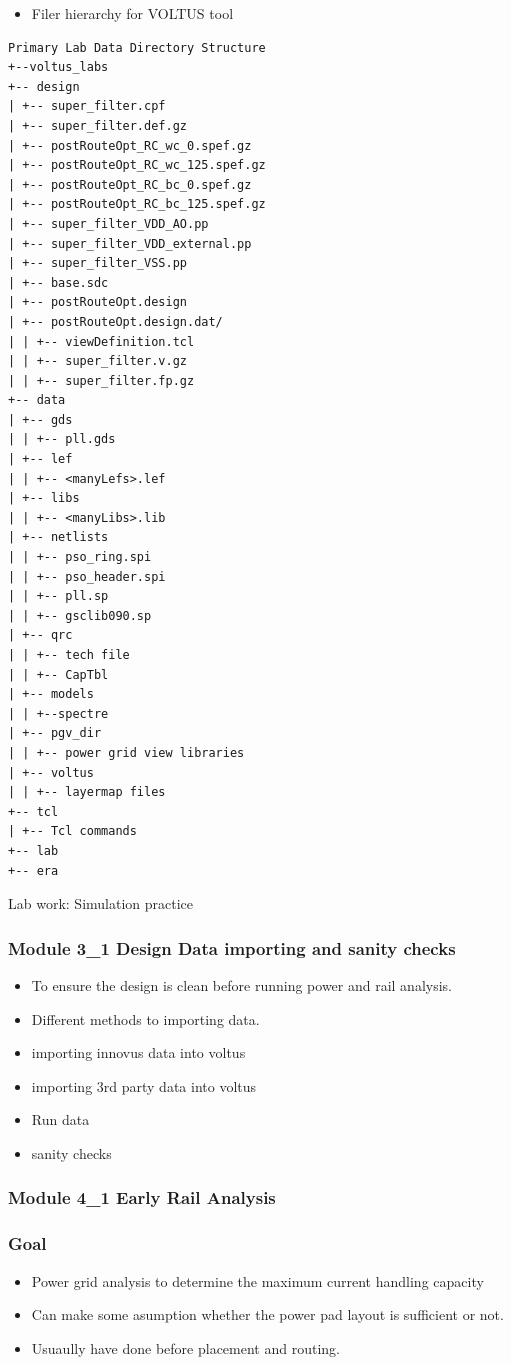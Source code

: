 \documentclass[a4paper]{article}
\begin{document}
\begin{itemize}
\item Filer hierarchy for VOLTUS tool
\end{itemize}
\begin{verbatim}
Primary Lab Data Directory Structure
+--voltus_labs
+-- design
| +-- super_filter.cpf
| +-- super_filter.def.gz
| +-- postRouteOpt_RC_wc_0.spef.gz
| +-- postRouteOpt_RC_wc_125.spef.gz
| +-- postRouteOpt_RC_bc_0.spef.gz
| +-- postRouteOpt_RC_bc_125.spef.gz
| +-- super_filter_VDD_AO.pp
| +-- super_filter_VDD_external.pp
| +-- super_filter_VSS.pp
| +-- base.sdc
| +-- postRouteOpt.design
| +-- postRouteOpt.design.dat/
| | +-- viewDefinition.tcl
| | +-- super_filter.v.gz
| | +-- super_filter.fp.gz
+-- data
| +-- gds
| | +-- pll.gds
| +-- lef
| | +-- <manyLefs>.lef
| +-- libs
| | +-- <manyLibs>.lib
| +-- netlists
| | +-- pso_ring.spi
| | +-- pso_header.spi
| | +-- pll.sp
| | +-- gsclib090.sp
| +-- qrc
| | +-- tech file
| | +-- CapTbl
| +-- models
| | +--spectre
| +-- pgv_dir
| | +-- power grid view libraries
| +-- voltus
| | +-- layermap files
+-- tcl
| +-- Tcl commands
+-- lab
+-- era

\end{verbatim}



Lab work: Simulation practice

\subsubsection{Module 3\_1 Design Data importing and sanity checks}
\label{sec:org38cdfdf}
\begin{itemize}
\item To ensure the design is clean before running power and rail analysis.
\item Different methods to importing data.
\item importing innovus data into voltus
\item importing 3rd party data into voltus
\item Run data
\item sanity checks
\end{itemize}

\subsubsection{Module 4\_1 Early Rail Analysis}
\label{sec:org9e38eb4}

\subsubsection{Goal}
\label{sec:orgfdf6868}
\begin{itemize}
\item Power grid analysis to determine the maximum current handling capacity
\item Can make some asumption whether the power pad layout is sufficient or not.
\item Usuaully have done before placement and routing.
\end{itemize}
\end{document}
